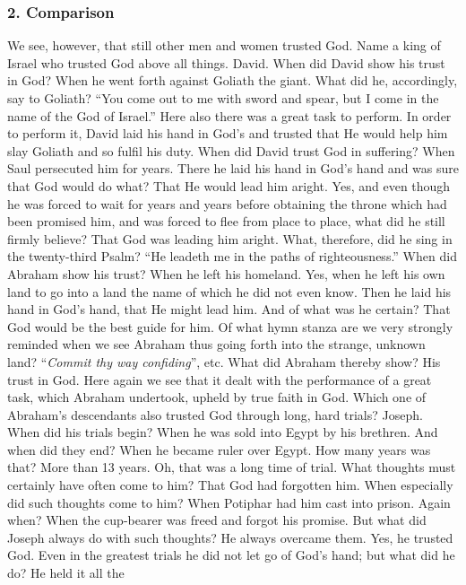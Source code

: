 \subsubsection{2. Comparison}

We see, however, that still other men and women trusted God. Name a king of Israel who trusted God above all things. David. When did David show his trust in God? When he went forth against Goliath the giant. What did he, accordingly, say to Goliath? “You come out to me with sword and spear, but I come in the name of the God of Israel.” Here also there was a great task to perform. In order to perform it, David laid his hand in God’s and trusted that He would help him slay Goliath and so fulfil his duty. When did David trust God in suffering? When Saul persecuted him for years. There he laid his hand in God’s hand and was sure that God would do what? That He would lead him aright. Yes, and even though he was forced to wait for years and years before obtaining the throne which had been promised him, and was forced to flee from place to place, what did he still firmly believe? That God was leading him aright. What, therefore, did he sing in the twenty-third Psalm? “He leadeth me in the paths of righteousness.” When did Abraham show his trust? When he left his homeland. Yes, when he left his own land to go into a land the name of which he did not even know. Then he laid his hand in God’s hand, that He might lead him. And of what was he certain? That God would be the best guide for him. Of what hymn stanza are we very strongly reminded when we see Abraham thus going forth into the strange, unknown land? “\emph{Commit thy way confiding}”, etc. What did Abraham thereby show? His trust in God. Here again we see that it dealt with the performance of a great task, which Abraham undertook, upheld by true faith in God. Which one of Abraham’s descendants also trusted God through long, hard trials? Joseph. When did his trials begin? When he was sold into Egypt by his brethren. And when did they end? When he became ruler over Egypt. How many years was that? More than 13 years. Oh, that was a long time of trial. What thoughts must certainly have often come to him? That God had forgotten him. When especially did such thoughts come to him? When Potiphar had him cast into prison. Again when? When the cup-bearer was freed and forgot his promise. But what did Joseph always do with such thoughts? He always overcame them. Yes, he trusted God. Even in the greatest trials he did not let go of God’s hand; but what did he do? He held it all the
